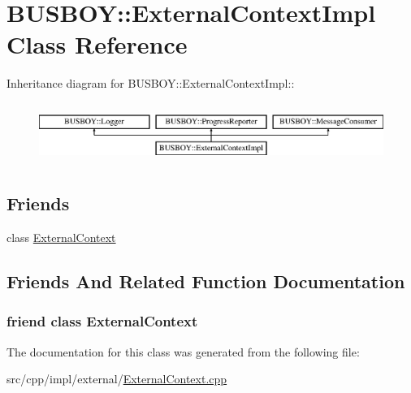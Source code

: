 \hypertarget{classBUSBOY_1_1ExternalContextImpl}{
\section{BUSBOY::ExternalContextImpl Class Reference}
\label{classBUSBOY_1_1ExternalContextImpl}
}
Inheritance diagram for BUSBOY::ExternalContextImpl::\begin{figure}[H]
\begin{center}
\leavevmode
\includegraphics[height=1.99644cm]{classBUSBOY_1_1ExternalContextImpl}
\end{center}
\end{figure}
\subsection*{Friends}
\begin{DoxyCompactItemize}
\item 
class \hyperlink{classBUSBOY_1_1ExternalContextImpl_a1bb7836018153f13a58ee46ecf592b57}{ExternalContext}
\end{DoxyCompactItemize}


\subsection{Friends And Related Function Documentation}
\hypertarget{classBUSBOY_1_1ExternalContextImpl_a1bb7836018153f13a58ee46ecf592b57}{
\subsubsection[{ExternalContext}]{\setlength{\rightskip}{0pt plus 5cm}friend class {\bf ExternalContext}}}
\label{classBUSBOY_1_1ExternalContextImpl_a1bb7836018153f13a58ee46ecf592b57}


The documentation for this class was generated from the following file:\begin{DoxyCompactItemize}
\item 
src/cpp/impl/external/\hyperlink{ExternalContext_8cpp}{ExternalContext.cpp}\end{DoxyCompactItemize}

